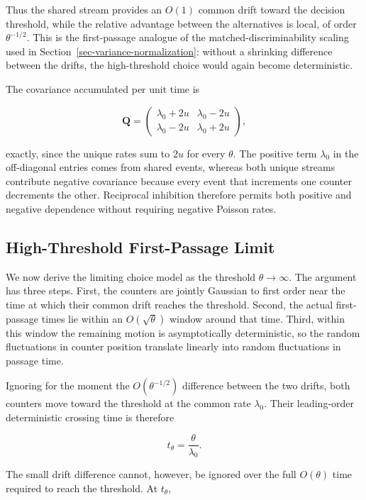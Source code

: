 \documentclass[
  man,
  floatsintext,
  longtable,
  a4paper,
  nolmodern,
  notxfonts,
  notimes,
  colorlinks=true,linkcolor=blue,citecolor=blue,urlcolor=blue]{apa7}
\begin{document}
Thus the shared stream provides an \(O(1)\) common drift toward the
decision threshold, while the relative advantage between the
alternatives is local, of order \(\theta^{-1/2}\). This is the
first-passage analogue of the matched-discriminability scaling used in
Section~\ref{sec-variance-normalization}: without a shrinking difference
between the drifts, the high-threshold choice would again become
deterministic.

The covariance accumulated per unit time is

\[
\mathbf Q
=
\begin{pmatrix}
\lambda_0+2u & \lambda_0-2u\\
\lambda_0-2u & \lambda_0+2u
\end{pmatrix},
\]

exactly, since the unique rates sum to \(2u\) for every \(\theta\). The
positive term \(\lambda_0\) in the off-diagonal entries comes from
shared events, whereas both unique streams contribute negative
covariance because every event that increments one counter decrements
the other. Reciprocal inhibition therefore permits both positive and
negative dependence without requiring negative Poisson rates.

\subsection{High-Threshold First-Passage
Limit}\label{high-threshold-first-passage-limit}

We now derive the limiting choice model as the threshold
\(\theta\to\infty\). The argument has three steps. First, the counters
are jointly Gaussian to first order near the time at which their common
drift reaches the threshold. Second, the actual first-passage times lie
within an \(O(\sqrt{\theta})\) window around that time. Third, within
this window the remaining motion is asymptotically deterministic, so the
random fluctuations in counter position translate linearly into random
fluctuations in passage time.

Ignoring for the moment the \(O(\theta^{-1/2})\) difference between the
two drifts, both counters move toward the threshold at the common rate
\(\lambda_0\). Their leading-order deterministic crossing time is
therefore

\[
t_\theta=\frac{\theta}{\lambda_0}.
\]

The small drift difference cannot, however, be ignored over the full
\(O(\theta)\) time required to reach the threshold. At \(t_\theta\),
\end{document}
